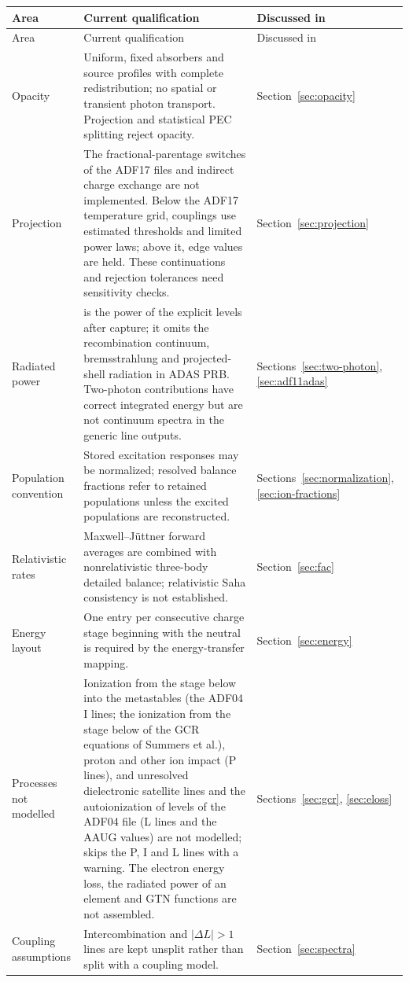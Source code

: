 \documentclass[11pt,a4paper]{article}
\newcommand{\code}[1]{\texttt{\detokenize{#1}}}
\newcommand{\routine}[1]{\textsf{\detokenize{#1}}}
\numberwithin{equation}{section}
\begin{document}
\begin{longtable}{>{\raggedright\arraybackslash}p{3.0cm}>{\raggedright\arraybackslash}p{7.6cm}>{\raggedright\arraybackslash}p{3.0cm}}
\toprule Area & Current qualification & Discussed in\\\midrule
\endfirsthead
\toprule Area & Current qualification & Discussed in\\\midrule
\endhead
Opacity & Uniform, fixed absorbers and source profiles with complete redistribution; no spatial or transient photon transport. Projection and statistical PEC splitting reject opacity. & Section~\ref{sec:opacity}\\
Projection & The fractional-parentage switches of the \code{cbnm93} ADF17 files and indirect charge exchange are not implemented. Below the ADF17 temperature grid, couplings use estimated thresholds and limited power laws; above it, edge values are held. These continuations and rejection tolerances need sensitivity checks. & Section~\ref{sec:projection}\\
Radiated power & \code{prb} is the power of the explicit levels after capture; it omits the recombination continuum, bremsstrahlung and projected-shell radiation in ADAS PRB. Two-photon contributions have correct integrated energy but are not continuum spectra in the generic line outputs. & Sections~\ref{sec:two-photon}, \ref{sec:adf11adas}\\
Population convention & Stored excitation responses may be normalized; resolved balance fractions refer to retained populations unless the excited populations are reconstructed. & Sections~\ref{sec:normalization}, \ref{sec:ion-fractions}\\
Relativistic rates & Maxwell--J\"uttner forward averages are combined with nonrelativistic three-body detailed balance; relativistic Saha consistency is not established. & Section~\ref{sec:fac}\\
Energy layout & One entry per consecutive charge stage beginning with the neutral is required by the energy-transfer mapping. & Section~\ref{sec:energy}\\
Processes not modelled & Ionization from the stage below into the metastables (the ADF04 I lines; the ionization from the stage below of the GCR equations of Summers et al.), proton and other ion impact (P lines), and unresolved dielectronic satellite lines and the autoionization of levels of the ADF04 file (L lines and the AAUG values) are not modelled; \routine{read_adf04} skips the P, I and L lines with a warning. The electron energy loss, the radiated power of an element and GTN functions are not assembled. & Sections~\ref{sec:gcr}, \ref{sec:eloss}\\
Coupling assumptions & Intercombination and $|\Delta L|>1$ lines are kept unsplit rather than split with a coupling model. & Section~\ref{sec:spectra}\\
\bottomrule
\end{longtable}
\end{document}
